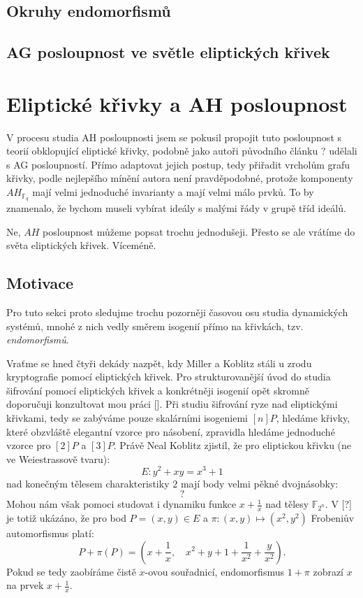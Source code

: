 \documentclass[12pt]{report}
\begin{document}
\section{Okruhy endomorfismů}

\section{AG posloupnost ve světle eliptických křivek}

\chapter{Eliptické křivky a AH posloupnost}

V procesu studia AH posloupnosti jsem se pokusil propojit tuto posloupnost s teorií obklopující eliptické křivky, podobně jako autoři původního článku ? udělali s AG posloupností. Přímo adaptovat jejich postup, tedy přiřadit vrcholům grafu křivky, podle nejlepšího mínění autora není pravděpodobné, protože komponenty $AH_{\mathbb{F}_q}$ mají velmi jednoduché invarianty a mají velmi málo prvků. To by znamenalo, že bychom museli vybírat ideály s malými řády v grupě tříd ideálů. 

Ne, $AH$ posloupnost můžeme popsat trochu jednodušeji. Přesto se ale vrátíme do světa eliptických křivek. Víceméně.

\section{Motivace}

Pro tuto sekci proto sledujme trochu pozorněji časovou osu studia dynamických systémů, mnohé z nich vedly směrem isogenií přímo na křivkách, tzv. \textit{endomorfismů}.

Vraťme se hned čtyři dekády nazpět, kdy Miller a Koblitz stáli u zrodu kryptografie pomocí eliptických křivek. Pro strukturovanější úvod do studia šifrování pomocí eliptických křivek a konkrétněji isogenií opět skromně doporučuji konzultovat mou práci []. Při studiu šifrování ryze nad eliptickými křivkami, tedy se zabýváme pouze skalárními isogeniemi $[n]P$, hledáme křivky, které obzvláště elegantní vzorce pro násobení, zpravidla hledáme jednoduché vzorce pro $[2]P$ a $[3]P$. Právě Neal Koblitz zjistil, že pro eliptickou křivku (ne ve Weiestrassově tvaru):
$$E : y^2 + xy = x^3 + 1$$
nad konečným tělesem charakteristiky $2$ mají body velmi pěkné dvojnásobky:
$$?$$ 
Mohou nám však pomoci studovat i dynamiku funkce $x + \frac{1}{x}$ nad tělesy $\mathbb{F}_{2^n}$. V [?] je totiž ukázáno, že pro bod $P = (x,y) \in E$ a $\pi : (x,y) \longmapsto (x^2,y^2)$ Frobeniův automorfismus platí:
$$P + \pi (P) = \left(x + \frac{1}{x} , \quad x^2 + y + 1 + \frac{1}{x^2} + \frac{y}{x^2} \right).$$
Pokud se tedy zaobíráme čistě $x$-ovou souřadnicí, endomorfismus $1+\pi$ zobrazí $x$ na prvek $x+\frac{1}{x}$.
\end{document}
